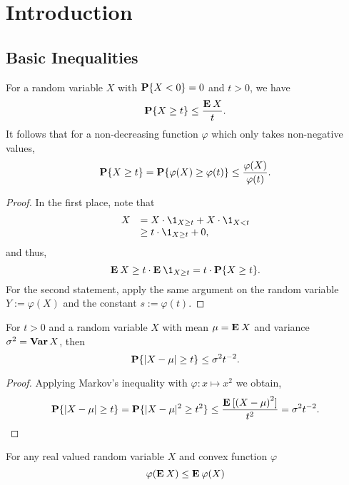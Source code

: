 \chapter{Introduction}

\section{Basic Inequalities}


\begin{theorem}\label{markov}
  For a random variable $X$ with $\P\{X < 0\} = 0$ and $t>0$, we have
  \[ \P\{X \geq t\} \leq \frac{\E X}{t}.\]
  It follows that for a non-decreasing function $\varphi$ which only takes non-negative values,
  \[ \P\{X \geq t\} = \P\{\varphi(X) \geq \varphi(t)\} \leq \frac{\varphi(X)}{\varphi(t)}.\]
\end{theorem}

\vspace*{1em}

\begin{proof}
 In the first place, note that
 \[ \begin{array}{rl}
  X & = X\cdot \1_{X\geq t} + X \cdot \1_{X < t}\\
    & \geq t \cdot \1_{X\geq t} + 0,
 \end{array}\]
and thus,
\[ \E X \geq t \cdot \E \1_{X\geq t} = t \cdot \P\{X \geq t\}. \]
For the second statement, apply the same argument on the random variable $Y := \varphi(X)$ and the constant $s := \varphi(t)$.
\end{proof}

\vspace*{2em}

\begin{theorem}\label{chebyshev}
  For $t > 0$ and a random variable $X$ with mean $\mu = \E X$ and variance $\sigma^2 = \Var X$, then
  \[ \P\{|X-\mu| \geq t\} \leq \sigma^2 t^{-2}. \] 
\end{theorem}

\begin{proof}
  Applying Markov's inequality with $\varphi: x \mapsto x^2$ we obtain,
  \[ \P\{|X-\mu| \geq t \} = \P\{|X-\mu|^2 \geq t^2 \} \leq \frac{\E [{(X-\mu)}^2]}{t^2} = \sigma^2 t^{-2}.\] 
\end{proof}
 

\begin{theorem}\label{jensen}
  For any real valued random variable $X$ and convex function $\varphi$
  \[ \varphi(\E X) \leq \E \varphi(X) \] 
\end{theorem}